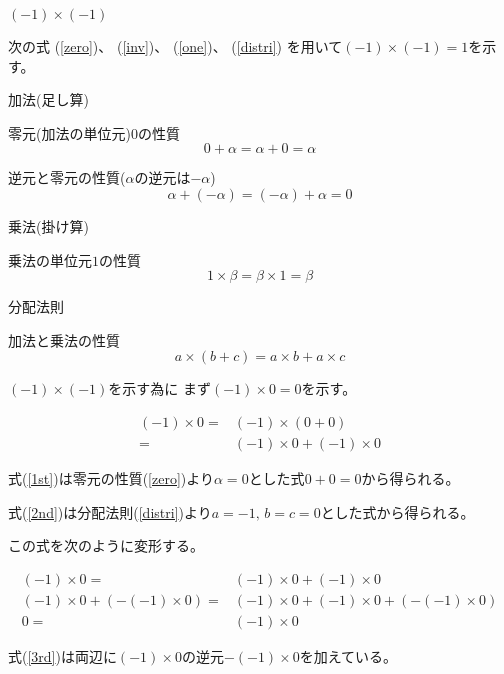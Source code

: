 \documentclass[12pt,b5paper]{ltjsarticle}
\begin{document}
\hrulefill
\textbf{$(-1)\times(-1)$}
\hrulefill

次の式
(\ref{zero})、
(\ref{inv})、
(\ref{one})、
(\ref{distri})
を用いて$(-1)\times (-1)=1$を示す。


\dotfill
加法(足し算)
\dotfill

零元(加法の単位元)$0$の性質
\begin{equation}
 0 + \alpha
  = \alpha + 0
  = \alpha
  \label{zero}
\end{equation}

逆元と零元の性質($\alpha$の逆元は$-\alpha$)
\begin{equation}
 \alpha + (-\alpha)
  = (-\alpha) + \alpha
  =0
  \label{inv}
\end{equation}

\dotfill
乗法(掛け算)
\dotfill

乗法の単位元$1$の性質
\begin{equation}
 1\times \beta
  = \beta \times 1
  = \beta
  \label{one}
\end{equation}

\dotfill
分配法則
\dotfill

加法と乗法の性質
\begin{equation}
 a\times (b+c) = a\times b + a\times c
  \label{distri}
\end{equation}

\hrulefill

$(-1)\times (-1)$を示す為に
まず$(-1)\times 0 = 0$を示す。

\begin{align}
 (-1)\times 0
 =& (-1)\times ( 0 + 0 )\label{1st}\\
 =& (-1)\times 0 + (-1)\times 0\label{2nd}
\end{align}

式(\ref{1st})は零元の性質(\ref{zero})より$\alpha=0$とした式$0+0=0$から得られる。

式(\ref{2nd})は分配法則(\ref{distri})より$a=-1,\, b=c=0$とした式から得られる。

この式を次のように変形する。

\begin{align}
 (-1)\times 0 =& (-1)\times 0 + (-1)\times 0\\
 (-1)\times 0 + (- (-1)\times 0) =& (-1)\times 0 + (-1)\times 0  + (- (-1)\times 0)\label{3rd}\\
 0 =& (-1)\times 0\label{4th}
\end{align}

式(\ref{3rd})は両辺に$(-1)\times 0$の逆元$-(-1)\times 0$を加えている。
\end{document}
